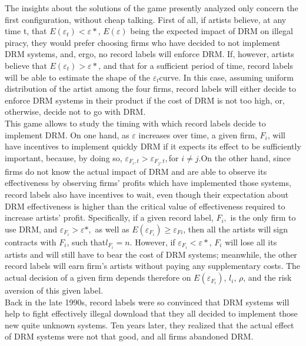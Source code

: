 \documentclass[a4paper,12pt]{article}
\numberwithin{equation}{section}
\begin{document}
The insights about the solutions of the game presently analyzed only
concern the first configuration, without cheap talking. First of all,
if artists believe, at any time t, that $E(\varepsilon_{t})<\varepsilon*$,
$E(\varepsilon)$ being the expected impact of DRM on illegal piracy,
they would prefer choosing firms who have decided to not implement
DRM systems, and, ergo, no record labels will enforce DRM. If, however,
artists believe that $E(\varepsilon_{t})>\varepsilon*$, and that
for a sufficient period of time, record labels will be able to estimate
the shape of the $\varepsilon_{t}$curve. In this case, assuming uniform
distribution of the artist among the four firms, record labels will
either decide to enforce DRM systems in their product if the cost
of DRM is not too high, or, otherwise, decide not to go with DRM.\\

This game allows to study the timing with which record labels decide
to implement DRM. On one hand, as $\varepsilon$ increases over time,
a given firm, $F_{i}$, will have incentives to implement quickly
DRM if it expects its effect to be sufficiently important, because,
by doing so, $\varepsilon_{F_{i},t}>\varepsilon_{F_{j},t},$for $i\neq j.$On
the other hand, since firms do not know the actual impact of DRM and
are able to observe its effectiveness by observing firms' profits
which have implemented those systems, record labels also have incentives
to wait, even though their expectation about DRM effectiveness is
higher than the critical value of effectiveness required to increase
artists' profit. Specifically, if a given record label, $F_{i},$
is the only firm to use DRM, and $\varepsilon_{F_{i}}>\varepsilon*,$
as well as $E(\varepsilon_{F_{i}})\geq\varepsilon_{Fi}$, then all
the artists will sign contracts with $F_{i}$, such that$l_{F_{i}}=n$.
However, if $\varepsilon_{F_{i}}<\varepsilon*$, $F_{i}$ will lose
all its artists and will still have to bear the cost of DRM systems;
meanwhile, the other record labels will earn firm's artists without
paying any supplementary costs. The actual decision of a given firm
depends therefore on $E(\varepsilon_{F_{i}})$, $l_{i}$, $\rho$,
and the risk aversion of this given label.\\

Back in the late 1990s, record labels were so convinced that DRM systems
will help to fight effectively illegal download that they all decided
to implement those new quite unknown systems. Ten years later, they
realized that the actual effect of DRM systems were not that good,
and all firms abandoned DRM.
\end{document}
